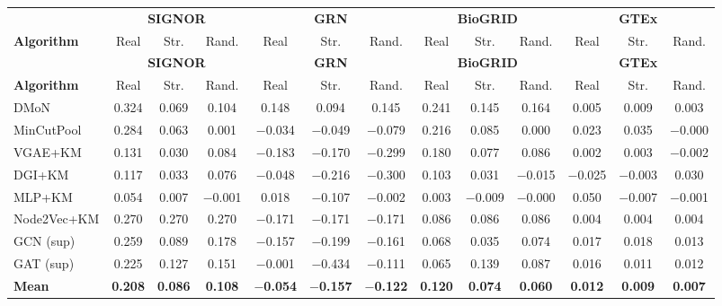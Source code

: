 %

\begin{longtable}{l|ccc|ccc|ccc|ccc}
\toprule
& \multicolumn{3}{c|}{\textbf{SIGNOR}} & \multicolumn{3}{c|}{\textbf{GRN}} & \multicolumn{3}{c|}{\textbf{BioGRID}} & \multicolumn{3}{c}{\textbf{GTEx}} \\
\textbf{Algorithm} & Real & Str. & Rand. & Real & Str. & Rand. & Real & Str. & Rand. & Real & Str. & Rand. \\
\midrule
\endfirsthead
\toprule
& \multicolumn{3}{c|}{\textbf{SIGNOR}} & \multicolumn{3}{c|}{\textbf{GRN}} & \multicolumn{3}{c|}{\textbf{BioGRID}} & \multicolumn{3}{c}{\textbf{GTEx}} \\
\textbf{Algorithm} & Real & Str. & Rand. & Real & Str. & Rand. & Real & Str. & Rand. & Real & Str. & Rand. \\
\midrule
\endhead

DMoN & 0.324 & 0.069 & 0.104 & 0.148 & 0.094 & 0.145 & 0.241 & 0.145 & 0.164 & 0.005 & 0.009 & 0.003 \\
MinCutPool & 0.284 & 0.063 & 0.001 & $-$0.034 & $-$0.049 & $-$0.079 & 0.216 & 0.085 & 0.000 & 0.023 & 0.035 & $-$0.000 \\
VGAE+KM & 0.131 & 0.030 & 0.084 & $-$0.183 & $-$0.170 & $-$0.299 & 0.180 & 0.077 & 0.086 & 0.002 & 0.003 & $-$0.002 \\
DGI+KM & 0.117 & 0.033 & 0.076 & $-$0.048 & $-$0.216 & $-$0.300 & 0.103 & 0.031 & $-$0.015 & $-$0.025 & $-$0.003 & 0.030 \\
MLP+KM & 0.054 & 0.007 & $-$0.001 & 0.018 & $-$0.107 & $-$0.002 & 0.003 & $-$0.009 & $-$0.000 & 0.050 & $-$0.007 & $-$0.001 \\
Node2Vec+KM & 0.270 & 0.270 & 0.270 & $-$0.171 & $-$0.171 & $-$0.171 & 0.086 & 0.086 & 0.086 & 0.004 & 0.004 & 0.004 \\
GCN (sup) & 0.259 & 0.089 & 0.178 & $-$0.157 & $-$0.199 & $-$0.161 & 0.068 & 0.035 & 0.074 & 0.017 & 0.018 & 0.013 \\
GAT (sup) & 0.225 & 0.127 & 0.151 & $-$0.001 & $-$0.434 & $-$0.111 & 0.065 & 0.139 & 0.087 & 0.016 & 0.011 & 0.012 \\

\midrule
\textbf{Mean} & \textbf{0.208} & \textbf{0.086} & \textbf{0.108} & \textbf{$-$0.054} & \textbf{$-$0.157} & \textbf{$-$0.122} & \textbf{0.120} & \textbf{0.074} & \textbf{0.060} & \textbf{0.012} & \textbf{0.009} & \textbf{0.007} \\
\bottomrule
\end{longtable}

